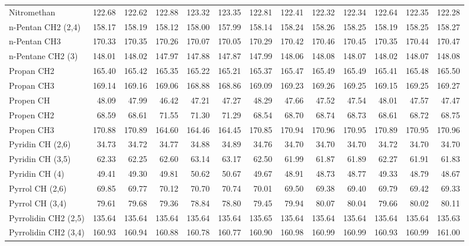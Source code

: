 \begin{table}[ht!]
{\begin{tabular}{lrrrrrrrrrrrr}
    Nitromethan & 122.68 & 122.62 & 122.88 & 123.32 & 123.35 & 122.81 & 122.41 & 122.32 & 122.34 & 122.64 & 122.35 & 122.28 \\
    n-Pentan CH2 (2,4) & 158.17 & 158.19 & 158.12 & 158.00 & 157.99 & 158.14 & 158.24 & 158.26 & 158.25 & 158.19 & 158.25 & 158.27 \\
    n-Pentan CH3 & 170.33 & 170.35 & 170.26 & 170.07 & 170.05 & 170.29 & 170.42 & 170.46 & 170.45 & 170.35 & 170.44 & 170.47 \\
    n-Pentane CH2 (3)  & 148.01 & 148.02 & 147.97 & 147.88 & 147.87 & 147.99 & 148.06 & 148.08 & 148.07 & 148.02 & 148.07 & 148.08 \\
    Propan CH2 & 165.40 & 165.42 & 165.35 & 165.22 & 165.21 & 165.37 & 165.47 & 165.49 & 165.49 & 165.41 & 165.48 & 165.50 \\
    Propan CH3 & 169.14 & 169.16 & 169.06 & 168.88 & 168.86 & 169.09 & 169.23 & 169.26 & 169.25 & 169.15 & 169.25 & 169.27 \\
    Propen CH & 48.09 & 47.99 & 46.42 & 47.21 & 47.27 & 48.29 & 47.66 & 47.52 & 47.54 & 48.01 & 47.57 & 47.47 \\
    Propen CH2 & 68.59 & 68.61 & 71.55 & 71.30 & 71.29 & 68.54 & 68.70 & 68.74 & 68.73 & 68.61 & 68.72 & 68.75 \\
    Propen CH3 & 170.88 & 170.89 & 164.60 & 164.46 & 164.45 & 170.85 & 170.94 & 170.96 & 170.95 & 170.89 & 170.95 & 170.96 \\
    Pyridin CH (2,6) & 34.73 & 34.72 & 34.77 & 34.88 & 34.89 & 34.76 & 34.70 & 34.70 & 34.70 & 34.72 & 34.70 & 34.70 \\
    Pyridin CH (3,5) & 62.33 & 62.25 & 62.60 & 63.14 & 63.17 & 62.50 & 61.99 & 61.87 & 61.89 & 62.27 & 61.91 & 61.83 \\
    Pyridin CH (4) & 49.41 & 49.30 & 49.81 & 50.62 & 50.67 & 49.67 & 48.91 & 48.73 & 48.77 & 49.33 & 48.79 & 48.67 \\
    Pyrrol CH (2,6) & 69.85 & 69.77 & 70.12 & 70.70 & 70.74 & 70.01 & 69.50 & 69.38 & 69.40 & 69.79 & 69.42 & 69.33 \\
    Pyrrol CH (3,4) & 79.61 & 79.68 & 79.36 & 78.84 & 78.80 & 79.45 & 79.94 & 80.07 & 80.04 & 79.66 & 80.02 & 80.11 \\
    Pyrrolidin CH2 (2,5) & 135.64 & 135.64 & 135.64 & 135.64 & 135.64 & 135.65 & 135.64 & 135.64 & 135.64 & 135.64 & 135.64 & 135.63 \\
    Pyrrolidin CH2 (3,4) & 160.93 & 160.94 & 160.88 & 160.78 & 160.77 & 160.90 & 160.98 & 160.99 & 160.99 & 160.93 & 160.99 & 161.00 \\

\end{tabular}}
\end{table}
